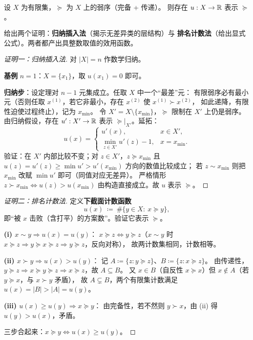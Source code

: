 \begin{theorem}[有限集表示定理]\label{thm:finite}
设 $X$ 为有限集，$\succeq$ 为 $X$ 上的弱序（完备 + 传递）。
则存在 $u:X\to\mathbb{R}$ 表示 $\succeq$。
\end{theorem}

给出两个证明：\textbf{归纳插入法}（揭示无差异类的层结构）与
\textbf{排名计数法}（给出显式公式）。两者都产出具整数取值的效用函数。

\begin{proof}[证明一：归纳插入法]
对 $|X|=n$ 作数学归纳。

\textbf{基例} $n=1$：$X=\{x_1\}$，取 $u(x_1)=0$ 即可。

\textbf{归纳步}：设定理对 $n-1$ 元集成立。任取 $X$ 中一个“最差”元：
有限弱序必有最小元（否则任取 $x^{(1)}$，若它非最小，存在 $x^{(2)}$ 使 $x^{(1)}\succ x^{(2)}$，
如此递降，有限性迫使过程终止），记为 $x_{\min}$。
令 $X'=X\setminus\{x_{\min}\}$，$\succeq$ 限制在 $X'$ 上仍是弱序。
由归纳假设，存在 $u':X'\to\mathbb{R}$ 表示 $\succeq|_{X'}$。延拓：
\[
u(x)=
\begin{cases}
u'(x), & x\in X',\\[2pt]
\min_{z\in X'} u'(z)-1, & x=x_{\min}.
\end{cases}
\]
验证：在 $X'$ 内部比较不变；对 $z\in X'$，$z\succeq x_{\min}$ 且
$u(z)=u'(z)\ge \min u' > u'(x_{\min})$ 方向的数值比较成立；
若 $z\sim x_{\min}$ 则把 $x_{\min}$ 改赋 $\min u'$ 即可（同值对应无差异）。
严格情形 $z\succ x_{\min}\iff u(z)>u(x_{\min})$ 由构造直接成立。故 $u$ 表示 $\succeq$。
\end{proof}

\begin{proof}[证明二：排名计数法]
定义\textbf{下截面计数函数}
\[
u(x)\ \coloneqq\ \#\{y\in X:\ x\succeq y\},
\]
即“被 $x$ 击败（含打平）的方案数”。验证它表示 $\succeq$。

\textbf{(i) $x\sim y\Rightarrow u(x)=u(y)$}：
$x\succeq z\iff y\succeq z$（$x\sim y$ 时 $x\succeq z\Rightarrow y\succeq x\succeq z\Rightarrow y\succeq z$，反向对称），
故两计数集相同，计数相等。

\textbf{(ii) $x\succ y\Rightarrow u(x)>u(y)$}：
记 $A\coloneqq\{z:y\succeq z\}$、$B\coloneqq\{z:x\succeq z\}$。
由传递性，$y\succeq z\Rightarrow x\succeq y\succeq z\Rightarrow x\succeq z$，故 $A\subseteq B$。
又 $x\in B$（自反性 $x\succeq x$）但 $x\notin A$（若 $y\succeq x$，与 $x\succ y$ 矛盾），
故 $A\subsetneq B$，两个有限集计数满足 $u(x)=|B|>|A|=u(y)$。

\textbf{(iii) $u(x)\ge u(y)\Rightarrow x\succeq y$}：
由完备性，若不然则 $y\succ x$，由 (ii) 得 $u(y)>u(x)$，矛盾。

三步合起来：$x\succeq y\iff u(x)\ge u(y)$。
\end{proof}

